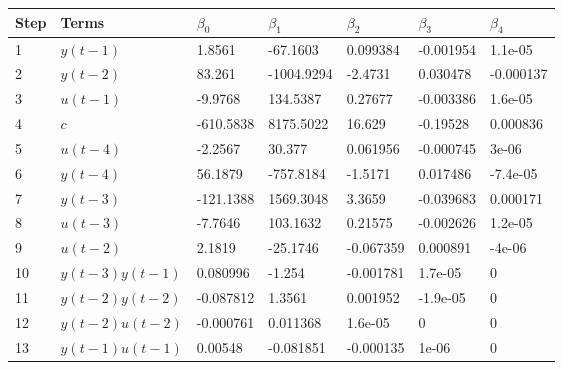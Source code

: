 \begin{tabular}{lllllll}
Step & Terms & $\beta_{0}$ & $\beta_{1}$ & $\beta_{2}$ & $\beta_{3}$ & $\beta_{4}$ \\ 
\hline 
1 & $y(t-1)$ & 1.8561 & -67.1603 & 0.099384 & -0.001954 & 1.1e-05 \\ 
2 & $y(t-2)$ & 83.261 & -1004.9294 & -2.4731 & 0.030478 & -0.000137 \\ 
3 & $u(t-1)$ & -9.9768 & 134.5387 & 0.27677 & -0.003386 & 1.6e-05 \\ 
4 & $c$ & -610.5838 & 8175.5022 & 16.629 & -0.19528 & 0.000836 \\ 
5 & $u(t-4)$ & -2.2567 & 30.377 & 0.061956 & -0.000745 & 3e-06 \\ 
6 & $y(t-4)$ & 56.1879 & -757.8184 & -1.5171 & 0.017486 & -7.4e-05 \\ 
7 & $y(t-3)$ & -121.1388 & 1569.3048 & 3.3659 & -0.039683 & 0.000171 \\ 
8 & $u(t-3)$ & -7.7646 & 103.1632 & 0.21575 & -0.002626 & 1.2e-05 \\ 
9 & $u(t-2)$ & 2.1819 & -25.1746 & -0.067359 & 0.000891 & -4e-06 \\ 
10 & $y(t-3)y(t-1)$ & 0.080996 & -1.254 & -0.001781 & 1.7e-05 & 0 \\ 
11 & $y(t-2)y(t-2)$ & -0.087812 & 1.3561 & 0.001952 & -1.9e-05 & 0 \\ 
12 & $y(t-2)u(t-2)$ & -0.000761 & 0.011368 & 1.6e-05 & 0 & 0 \\ 
13 & $y(t-1)u(t-1)$ & 0.00548 & -0.081851 & -0.000135 & 1e-06 & 0 \\ 
\hline 
\end{tabular}